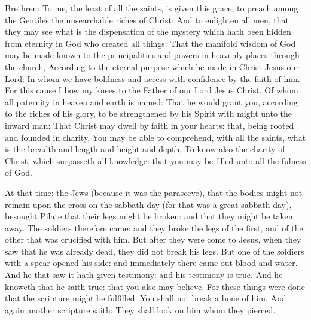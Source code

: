 Brethren: To me, the least of all the saints, is given this grace, to preach
among the Gentiles the unsearchable riches of Christ:
And to enlighten all men, that they may see what is the
dispensation of the mystery which hath been hidden from eternity in God
who created all things:
That the manifold wisdom of God may be made known to the
principalities and powers in heavenly places through the church,
According to the eternal purpose which he made in Christ Jesus our
Lord:
In whom we have boldness and access with confidence by the faith
of him.
For this cause I bow my knees to the Father of our Lord Jesus
Christ,
Of whom all paternity in heaven and earth is named:
That he would grant you, according to the riches of his glory, to
be strengthened by his Spirit with might unto the inward man:
That Christ may dwell by faith in your hearts: that, being rooted
and founded in charity,
You may be able to comprehend, with all the saints, what is the
breadth and length and height and depth,
To know also the charity of Christ, which surpasseth all
knowledge: that you may be filled unto all the fulness of God.

\bigskip


At that time: the Jews (because it was the parasceve), that the bodies
might not remain upon the cross on the sabbath day (for that was a great
sabbath day), besought Pilate that their legs might be broken: and that
they might be taken away.
The soldiers therefore came: and they broke the legs of the
first, and of the other that was crucified with him.
But after they were come to Jesus, when they saw that he was
already dead, they did not break his legs.
But one of the soldiers with a spear opened his side: and
immediately there came out blood and water.
And he that saw it hath given testimony: and his testimony is
true. And he knoweth that he saith true: that you also may believe.
For these things were done that the scripture might be fulfilled:
You shall not break a bone of him.
And again another scripture saith: They shall look on him whom
they pierced.







